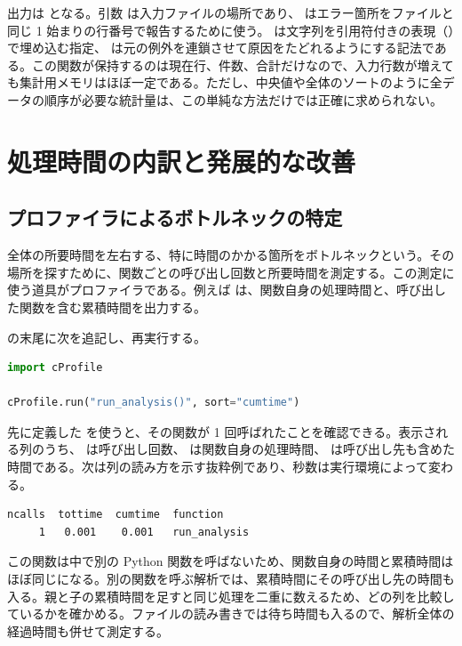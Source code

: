 出力は  となる。引数  は入力ファイルの場所であり、 はエラー箇所をファイルと同じ 1 始まりの行番号で報告するために使う。 は文字列を引用符付きの表現（）で埋め込む指定、 は元の例外を連鎖させて原因をたどれるようにする記法である。この関数が保持するのは現在行、件数、合計だけなので、入力行数が増えても集計用メモリはほぼ一定である。ただし、中央値や全体のソートのように全データの順序が必要な統計量は、この単純な方法だけでは正確に求められない。

\section{処理時間の内訳と発展的な改善}

\subsection{プロファイラによるボトルネックの特定}

全体の所要時間を左右する、特に時間のかかる箇所をボトルネックという。その場所を探すために、関数ごとの呼び出し回数と所要時間を測定する。この測定に使う道具がプロファイラである。例えば  は、関数自身の処理時間と、呼び出した関数を含む累積時間を出力する。

 の末尾に次を追記し、再実行する。

\begin{lstlisting}[language=Python]
import cProfile

cProfile.run("run_analysis()", sort="cumtime")
\end{lstlisting}

先に定義した  を使うと、その関数が 1 回呼ばれたことを確認できる。表示される列のうち、 は呼び出し回数、 は関数自身の処理時間、 は呼び出し先も含めた時間である。次は列の読み方を示す抜粋例であり、秒数は実行環境によって変わる。

\begin{lstlisting}[numbers=none, xleftmargin=2\zw]
ncalls  tottime  cumtime  function
     1   0.001    0.001   run_analysis
\end{lstlisting}

この関数は中で別の Python 関数を呼ばないため、関数自身の時間と累積時間はほぼ同じになる。別の関数を呼ぶ解析では、累積時間にその呼び出し先の時間も入る。親と子の累積時間を足すと同じ処理を二重に数えるため、どの列を比較しているかを確かめる。ファイルの読み書きでは待ち時間も入るので、解析全体の経過時間も併せて測定する。

